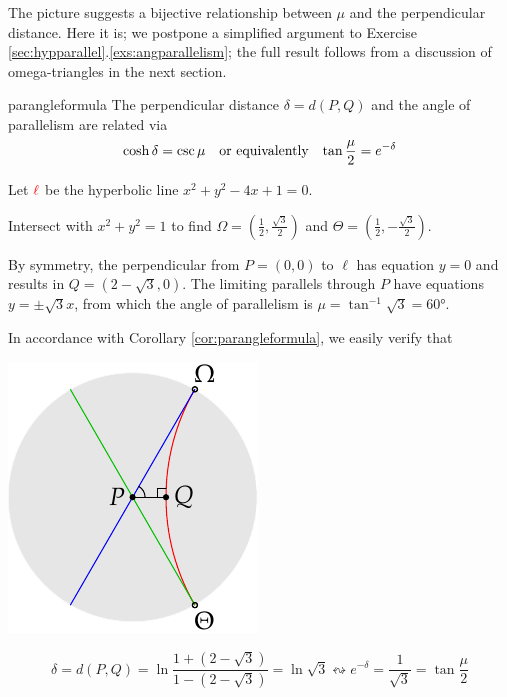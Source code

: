 The picture suggests a bijective relationship between $\mu$ and the perpendicular distance. Here it is; we postpone a simplified argument to Exercise \ref*{sec:hypparallel}.\ref{exs:angparallelism}; the full result follows from a discussion of omega-triangles in the next section.

\begin{cor}{}{parangleformula}
	The perpendicular distance $\delta=d(P,Q)$ and the angle of parallelism are related via
	\[
		\cosh\delta=\csc\mu\quad\text{or equivalently}\quad \smash[t]{\tan\frac{\mu}2}=e^{-\delta}
	\]
\end{cor}


\begin{examples}{}{}
	\exstart Let $\textcolor{red}{\ell}$ be the hyperbolic line $x^2+y^2-4x+1=0$.
	\begin{enumerate}\setcounter{enumi}{1}
		\begin{minipage}[t]{0.7\linewidth}\vspace{-5pt}
		  \item[]Intersect with $x^2+y^2=1$ to find $\Omega=\left(\tfrac 12,\tfrac{\sqrt 3}2\right)$ and $\Theta=\left(\tfrac 12,-\tfrac{\sqrt 3}2\right)$.\par
			By symmetry, the perpendicular from $P=(0,0)$ to $\ell$ has equation $y=0$ and results in $Q=(2-\sqrt 3,0)$.\smallbreak
			The limiting parallels through $P$ have equations $y=\pm\sqrt 3x$, from which the angle of parallelism is $\mu=\tan^{-1}\sqrt 3=\ang{60}$.\par
		  In accordance with Corollary \ref{cor:parangleformula}, we easily verify that
		\end{minipage}
		\hfill
		\begin{minipage}[t]{0.29\linewidth}\vspace{-25pt}
		  \flushright\includegraphics{basic-parallels4}
		\end{minipage}\par\vspace{-15pt}
		\[
			\delta=d(P,Q)=\ln\frac{1+(2-\sqrt 3)}{1-(2-\sqrt 3)}=\ln\sqrt 3 \leftrightsquigarrow e^{-\delta}=\frac 1{\sqrt 3}=\tan\frac{\mu}2
		\]
	  

\end{enumerate}
\end{examples}

